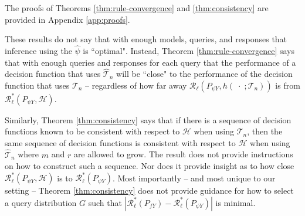 The proofs of Theorems \ref{thm:rule-convergence} and \ref{thm:consistency} are provided in Appendix \ref{app:proofs}. 

These results do not say that with enough models, queries, and responses that inference using the $ \widehat{\psi} $ is ``optimal". 
Instead, Theorem \ref{thm:rule-convergence} says that with enough queries and responses for each query that the performance of a decision function that uses $ \widehat{\mathcal{T}}_{n} $ will be ``close" to the performance of the decision function that uses $ \mathcal{T}_{n} $ -- regardless of how far away $ \mathcal{R}_{\ell}(P_{\psi Y}, h(\; \cdot \;; \mathcal{T}_{n})) $ is from $ \mathcal{R}_{\ell}^{*}(P_{\psi Y}, \mathcal{H}) $.

Similarly, Theorem \ref{thm:consistency} says that if there is a sequence of decision functions known to be consistent with respect to $ \mathcal{H} $ when using $ \mathcal{T}_{n} $, then the same sequence of decision functions is consistent with respect to $ \mathcal{H} $ when using $ \widehat{\mathcal{T}}_{n} $ where $ m $ and $ r $ are allowed to grow. 
The result does not provide instructions on how to construct such a sequence. Nor does it provide insight as to how close $ \mathcal{R}_{\ell}^{*}(P_{\psi Y}, \mathcal{H}) $ is to $ \mathcal{R}_{\ell}^{*}(P_{\psi Y}) $. 
Most importantly -- and most unique to our setting -- Theorem \ref{thm:consistency} does not provide guidance for how to select a query distribution $ G $ such that $ | \mathcal{R}_{\ell}^{*}(P_{f Y}) - \mathcal{R}_{\ell}^{*}(P_{\psi Y}) | $ is minimal. 

